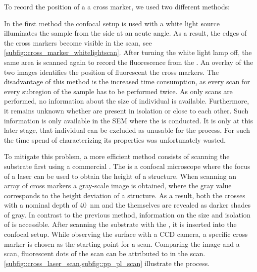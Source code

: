 		To record the position of a \nd \wrt a cross marker, we used two different methods:

		In the first method the confocal setup is used with a white light source illuminates the sample from the side at an acute angle. As a result, the edges of the cross markers become visible in the \fl scan, see \autoref{subfig::cross_marker_whitelightscan}. After turning the white light lamp off, the same area is scanned again to record the fluorescence from the \sivs. An overlay of the two images identifies the position of fluorescent \sivs \wrt the cross markers. The disadvantage of this method is the increased time consumption, as every scan for every subregion of the sample has to be performed twice. As only \fl scans are performed, no information about the size of individual \nds is available. Furthermore, it remains unknown whether \nds are present in isolation or close to each other. Such information is only available in the SEM where the \pp is conducted. It is only at this later stage, that individual \nds can be excluded as unusable for the \pp process. For such \nds the time spend of characterizing its properties was unfortunately wasted.

		To mitigate this problem, a more efficient method consists of scanning the substrate first using a commercial \lsm. The \lsm is a confocal microscope where the focus of a laser can be used to obtain the height of a structure. When scanning an array of cross markers a gray-scale image is obtained, where the gray value corresponds to the height deviation of a structure. As a result, both the crosses with a nominal depth of \SI{40}{\nm} and the \nds themselves are revealed as darker shades of gray. In contrast to the previous method, information on the size and isolation of \nds is accessible. After scanning the substrate with the \lsm, it is inserted into the confocal setup. While observing the surface with a CCD camera, a specific cross marker is chosen as the starting point for a \fl scan. Comparing the \lsm image and a \fl scan, fluorescent dots of the \fl scan can be attributed to \nds in the \lsm scan. \autoref{subfig::cross_laser_scan,subfig::pp_pl_scan} illustrate the process.

